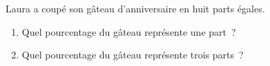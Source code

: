 \documentclass[exercice]{thedocument}%
\begin{document}
%
\begin{minipage}[t]{.5\linewidth}
    Laura a coupé son gâteau d'anniversaire en huit parts égales.
\end{minipage}%
\begin{minipage}[t]{.5\linewidth}
\end{minipage}
\begin{enumerate}
    \item Quel pourcentage du gâteau représente une part~?
    \item Quel pourcentage du gâteau représente trois parts~?
\end{enumerate}
\end{document}
